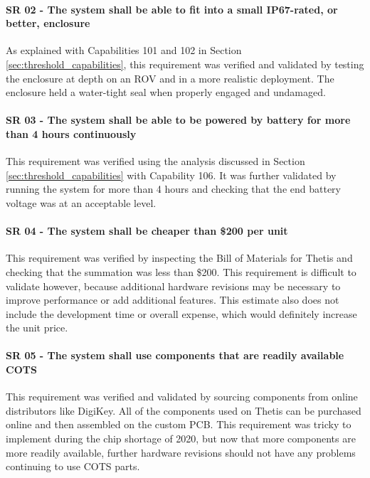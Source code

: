 \paragraph*{SR 02 - The system shall be able to fit into a small IP67-rated, or better, enclosure} As explained with Capabilities 101 and 102 in Section \ref{sec:threshold_capabilities}, this requirement was verified and validated by testing the enclosure at depth on an ROV and in a more realistic deployment.
The enclosure held a water-tight seal when properly engaged and undamaged.

\paragraph*{SR 03 - The system shall be able to be powered by battery for more than 4 hours continuously} This requirement was verified using the analysis discussed in Section \ref{sec:threshold_capabilities} with Capability 106. 
It was further validated by running the system for more than 4 hours and checking that the end battery voltage was at an acceptable level.

\paragraph*{SR 04 - The system shall be cheaper than \$200 per unit} This requirement was verified by inspecting the Bill of Materials for Thetis and checking that the summation was less than \$200.
This requirement is difficult to validate however, because additional hardware revisions may be necessary to improve performance or add additional features.
This estimate also does not include the development time or overall expense, which would definitely increase the unit price.

\paragraph*{SR 05 - The system shall use components that are readily available COTS} This requirement was verified and validated by sourcing components from online distributors like DigiKey.
All of the components used on Thetis can be purchased online and then assembled on the custom PCB. 
This requirement was tricky to implement during the chip shortage of 2020, but now that more components are more readily available, further hardware revisions should not have any problems continuing to use COTS parts.

